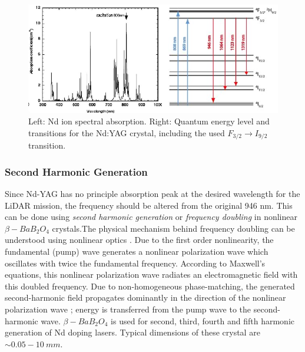 \begin{figure} [ht]
\centering
\includegraphics[scale=0.7]{chapters/img/laser_line.png}	
\caption{Left: Nd ion spectral absorption. Right: Quantum energy level and transitions for the Nd:YAG crystal, including the used $F_{3/2}\rightarrow I_{9/2}$ transition. }
\label{laser}
\end{figure}

\subsubsection{Second Harmonic Generation}
\label{SHG}
Since Nd-YAG has no principle absorption peak at the desired wavelength for the \acs{LiDAR} mission, the frequency should be altered from the original 946 nm. This can be done using \textit{second harmonic generation} or \textit{frequency doubling} in nonlinear $\beta-BaB_{2}O_{4}$ crystals.The physical mechanism behind frequency doubling can be understood using nonlinear optics \cite{lasertech}. Due to the first order nonlinearity, the fundamental (pump) wave generates a nonlinear polarization wave which oscillates with twice the fundamental frequency. According to Maxwell's equations, this nonlinear polarization wave radiates an electromagnetic field with this doubled frequency. Due to non-homogeneous phase-matching, the generated second-harmonic field propagates dominantly in the direction of the nonlinear polarization wave \cite{algaasdiodes}; energy is transferred from the pump wave to the second-harmonic wave. $\beta-BaB_{2}O_{4}$ is used for second, third, fourth and fifth harmonic generation of Nd doping \acp{laser}. Typical dimensions of these crystal are $\sim0.05 - 10\ mm$.

